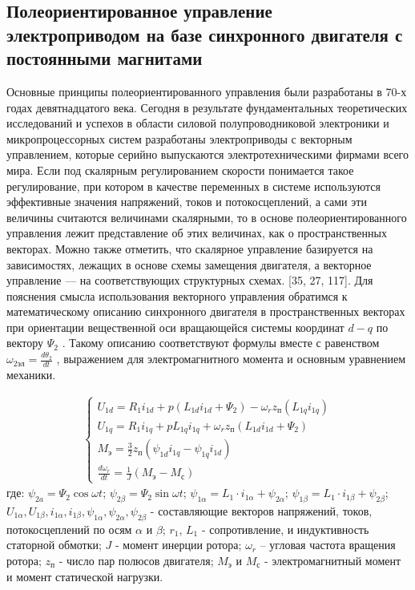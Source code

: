 \subsection{Полеориентированное управление электроприводом на базе синхронного двигателя с постоянными магнитами}
Основные принципы полеориентированного управления были разработаны в 70-х годах девятнадцатого века. Сегодня в результате фундаментальных теоретических исследований и успехов в области силовой полупроводниковой электроники и микропроцессорных систем разработаны электроприводы с векторным управлением, которые серийно выпускаются электротехническими фирмами всего мира. 
Если под скалярным регулированием скорости понимается такое регулирование, при котором в качестве переменных в системе используются эффективные значения напряжений, токов и потокосцеплений, а сами эти величины считаются величинами скалярными, то в основе полеориентированного управления лежит представление об этих величинах, как о пространственных векторах. Можно также отметить, что скалярное управление базируется на зависимостях, лежащих в основе схемы замещения двигателя, а векторное управление — на соответствующих структурных схемах. [35, 27, 117]. 
Для пояснения смысла использования векторного управления обратимся к математическому описанию синхронного двигателя в пространственных векторах при ориентации вещественной оси вращающейся системы координат $d-q$ по вектору ${\Psi }_{2}$ . Такому описанию соответствуют формулы  вместе с равенством $\omega_{2эл}=\frac{d \theta_{2}}{d t}$ , выражением для электромагнитного момента и основным уравнением механики. 

\begin{equation}
\label{eq:PMSMdqMw}
\begin{multlined}
	\begin{cases}
	U_{1 d}=R_{1} i_{1 d}+p\left(L_{1 d} i_{1 d}+\Psi_{2}\right)-\omega_{r} z_{\text{п}}\left(L_{1 q} i_{1 q}\right)
	\\
	U_{1 q}=R_{1} i_{1 q}+p L_{1 q} i_{1 q}+\omega_{r} z_{\text{п}}\left(L_{1 d} i_{1 d}+\Psi_{2}\right)
	\\
	M_{\text{э}}=\frac{3}{2} z_{\text{п}}\left(\psi_{1 d} i_{1 q}-\psi_{1 q} i_{1 d}\right)
	\\
	\frac{d \omega_{r}}{d t}=\frac{1}{J}\left(M_{\text{э}}-M_{\text{с}}\right)
	\end{cases}	
	\end{multlined}
\end{equation}
где: $\psi_{2 a}=\Psi_{2} \cos \omega t$; $\psi_{2 \beta}=\Psi_{2} \sin \omega t$; $\psi_{1 \alpha}=L_{1} \cdot i_{1 \alpha}+\psi_{2 \alpha}$; $\psi_{1 \beta}=L_{1} \cdot i_{1 \beta}+\psi_{2 \beta}$; $U_{1 \alpha}, U_{1 \beta}, i_{1 \alpha}, i_{1 \beta}, \psi_{1 \alpha}, \psi_{2 \alpha}, \psi_{2 \beta}$ - составляющие векторов напряжений, токов, потокосцеплений по осям $\alpha$ и $\beta$; $r_{1}$, $L_{1}$ - сопротивление, и индуктивность статорной обмотки; $J$ - момент инерции ротора; $\omega_{r}$ – угловая частота вращения ротора; $z_{\text{п}}$ - число пар полюсов двигателя; $M_{\text{э}}$ и $M_{\text{с}}$ - электромагнитный момент и момент статической нагрузки.


